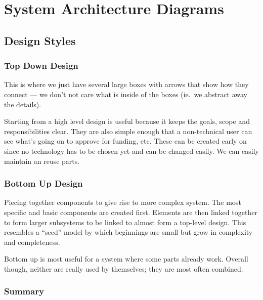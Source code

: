 \section{System Architecture Diagrams}\label{sec:system_architecture_diagrams}

\subsection{Design Styles}\label{sub:design_styles}

\subsubsection{Top Down Design}\label{ssub:top_down_design}

This is where we just have several large boxes with arrows that show how they connect --- we don't not care what is inside of the boxes (ie.\ we abstract away the details).

Starting from a high level design is useful because it keeps the goals, scope and responsibilities clear.
They are also simple enough that a non-technical user can see what's going on to approve for funding, etc.
These can be created early on since no technology has to be chosen yet and can be changed easily.
We can easily maintain an reuse parts.

\subsubsection{Bottom Up Design}\label{ssub:bottom_up_design}

Piecing together components to give rise to more complex system.
The most specific and basic components are created first.
Elements are then linked together to form larger subsystems to be linked to almost form a top-level design.
This resembles a ``seed'' model by which beginnings are small but grow in complexity and completeness.

Bottom up is most useful for a system where some parts already work.
Overall though, neither are really used by themselves; they are most often combined.

\subsubsection{Summary}\label{ssub:summary_design_styles}

